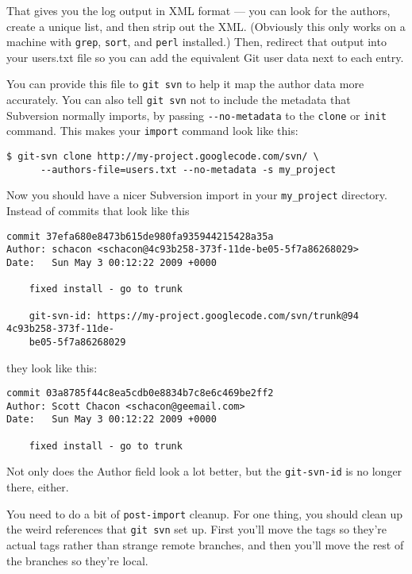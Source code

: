 \documentclass[a4paper]{book}
\begin{document}
That gives you the log output in XML format --- you can look for the authors, create a unique list, and then strip out the XML. (Obviously this only works on a machine with \texttt{grep}, \texttt{sort}, and \texttt{perl} installed.) Then, redirect that output into your users.txt file so you can add the equivalent Git user data next to each entry.

You can provide this file to \texttt{git svn} to help it map the author data more accurately. You can also tell \texttt{git svn} not to include the metadata that Subversion normally imports, by passing \texttt{-{}-no-metadata} to the \texttt{clone} or \texttt{init} command. This makes your \texttt{import} command look like this:

\begin{shaded}\begin{verbatim}
$ git-svn clone http://my-project.googlecode.com/svn/ \
      --authors-file=users.txt --no-metadata -s my_project
\end{verbatim}\end{shaded}

Now you should have a nicer Subversion import in your \texttt{my\_project} directory. Instead of commits that look like this

\begin{shaded}\begin{verbatim}
commit 37efa680e8473b615de980fa935944215428a35a
Author: schacon <schacon@4c93b258-373f-11de-be05-5f7a86268029>
Date:   Sun May 3 00:12:22 2009 +0000

    fixed install - go to trunk

    git-svn-id: https://my-project.googlecode.com/svn/trunk@94 4c93b258-373f-11de-
    be05-5f7a86268029
\end{verbatim}\end{shaded}

they look like this:

\begin{shaded}\begin{verbatim}
commit 03a8785f44c8ea5cdb0e8834b7c8e6c469be2ff2
Author: Scott Chacon <schacon@geemail.com>
Date:   Sun May 3 00:12:22 2009 +0000

    fixed install - go to trunk
\end{verbatim}\end{shaded}

Not only does the Author field look a lot better, but the \texttt{git-svn-id} is no longer there, either.

You need to do a bit of \texttt{post-import} cleanup. For one thing, you should clean up the weird references that \texttt{git svn} set up. First you'll move the tags so they're actual tags rather than strange remote branches, and then you'll move the rest of the branches so they're local.
\end{document}
